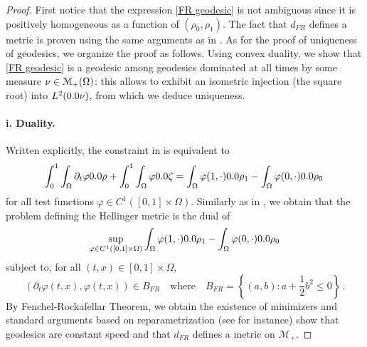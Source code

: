\begin{proof}
First notice that the expression \eqref{FR geodesic} is not ambiguous since it is positively homogeneous as a function of $(\rho_0,\rho_1)$. The fact that $d_{FR}$ defines a metric is proven using the same arguments as in . As for the proof of uniqueness of geodesics, we organize the proof as follows. Using convex duality, we show that \eqref{FR geodesic} is a geodesic among geodesics dominated at all times by some measure $\nu \in \mathcal{M}_+(\Omega)$: this allows to exhibit an isometric injection (the square root) into $L^2(\d\nu)$, from which we deduce uniqueness. 

\paragraph{i. Duality.}
Written explicitly, the constraint in  is equivalent to
\begin{equation}
\label{continuity FR}
\int_0^1 \int_{\Omega} \partial_t \varphi \d \rho + \int_0^1 \int_{\Omega} \varphi \d \Z = \int_{\Omega}  \varphi(1,\cdot) \d \rho_1 - \int_{\Omega} \varphi(0,\cdot)\d  \rho_0 \, 
\end{equation}
for all test functions $\varphi \in C^1( [0,1] \times \Omega)$.
%
Similarly as in , we obtain that the problem defining the Hellinger metric is the dual of
\[
\sup_{\varphi \in C^1( [0,1] \times \Omega)} \int_{\Omega} \varphi(1,\cdot) \d\rho_1 - \int_{\Omega} \varphi(0,\cdot) \d\rho_0 
\]
subject to, for all $(t,x)\in [0,1] \times \Omega$,
\[
 (\partial_t \varphi(t,x), \varphi(t,x))\in B_{FR}  \quad \text{where} \quad  B_{FR} = \left\{ (a,b) : a+\frac12 b^2 \leq 0 \right\}  \, .
\]
By Fenchel-Rockafellar Theorem, we obtain the existence of minimizers and standard arguments based on reparametrization (see \cite[Theorem 5.4]{dolbeault2009new} for instance) show that geodesics are constant speed and that $d_{FR}$ defines a metric on $\mathcal{M}_+$.



\end{proof}
